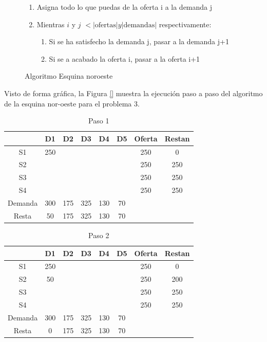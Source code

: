 \documentclass[12pt]{article}  %
\begin{document}
\begin{figure}[H]
	\centering
	\caption{Algoritmo Esquina noroeste}
	\label{fig:AlgoNoroeste}
	\begin{enumerate}
		\item Asigna todo lo que puedas de la oferta i a la demanda j
		\item Mientras $i$ y $j$ $< |\text{ofertas}| y |\text{demandas}|$ respectivamente:
		\begin{enumerate}
			\item Si se ha satisfecho la demanda j, pasar a la demanda j+1
			\item Si se a acabado la oferta i, pasar a la oferta i+1
		\end{enumerate}
	\end{enumerate}
\end{figure}

Visto de forma gráfica, la Figura \ref{} muestra la ejecución paso a paso del algoritmo de la esquina nor-oeste para el problema 3.

\begin{table}[H]
    \centering
        \caption{Paso 1}
        \label{tab:paso1Prob3}
        \begin{tabular}{c|ccccc|cc}
        & D1 & D2 & D3 & D4 & D5 & Oferta & Restan \\
        \hline
        S1 & \cellcolor{yellow} 250 &  &  &  &  & 250 & 0 \\
        S2 &  &  &  &  &  & 250 & 250 \\
        S3 &  &  &  &  &  & 250 & 250 \\
        S4 &  &  &  &  &  & 250 & 250 \\
        \hline
        Demanda & 300 & 175 & 325 & 130 & 70 & & \\
        Resta & 50 & 175 & 325 & 130 & 70 & & \\
        \end{tabular}
\end{table}

\begin{table}[H]
        \centering
        \caption{Paso 2}
        \label{tab:paso2Prob3}
        \begin{tabular}{c|ccccc|cc}
        & D1 & D2 & D3 & D4 & D5 & Oferta & Restan \\
        \hline
        S1 & 250 &  &  &  &  & 250 & 0 \\
        S2 &  \cellcolor{yellow} 50 &  &  &  &  & 250 & 200 \\
        S3 &  &  &  &  &  & 250 & 250 \\
        S4 &  &  &  &  &  & 250 & 250 \\
        \hline
        Demanda & 300 & 175 & 325 & 130 & 70 & & \\
        Resta & 0 & 175 & 325 & 130 & 70 & & \\
        \end{tabular}
\end{table}
\end{document}
